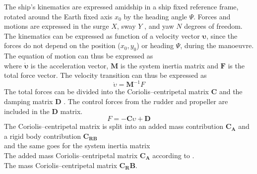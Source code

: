 The ship’s kinematics are expressed amidship in a ship fixed reference frame, rotated around the Earth fixed axis $x_0$ by the heading angle $\Psi$. Forces and motions are expressed in the surge $X$, sway $Y$ , and yaw $N$ degrees of freedom. The kinematics can be expressed as function of a velocity vector $\mathbf{\upsilon}$, since the forces do not depend on the position ($x_0,y_0$) or heading $\Psi$, during the manoeuvre.
\begin{equation}
    \label{eq:upsilon}
    
\end{equation}
The equation of motion can thus be expressed as
\begin{equation}
    \label{eq:upsilon1d}
    
\end{equation}
where $\mathbf{\dot{\upsilon}}$ is the acceleration vector, $\mathbf{M}$ is the system inertia matrix and $\mathbf{F}$ is the total force vector.
The velocity transition can thus be expressed as
\begin{equation}
    \label{eq:acc}
    \dot{\upsilon} = \mathbf{M}^{-1}F
\end{equation}
The total forces can be divided into the Coriolis–centripetal matrix $\mathbf{C}$ and the damping matrix $\mathbf{D}$ \citep{fossenHandbookMarineCraft2011}. The control forces from the rudder and propeller are included in the $\mathbf{D}$ matrix.
\begin{equation}
    \label{eq:upsilon1d}
F = - \mathbf{C} \upsilon + \mathbf{D}
\end{equation}
The Coriolis–centripetal matrix is split into an added mass contribution $\mathbf{C_A}$ and a rigid body contribution $\mathbf{C_{RB}}$
\begin{equation}
    \label{eq:C}
    
\end{equation}
and the same goes for the system inertia matrix
\begin{equation}
    \label{eq:M}
    
\end{equation}
The added mass Coriolis–centripetal matrix $\mathbf{C_A}$ according to \citep{imlayCOMPLETEEXPRESSIONSADDED1961}.
\begin{equation}
    \label{eq:C_A}
    
\end{equation}
The mass Coriolis–centripetal matrix $\mathbf{C_RB}$.
\begin{equation}
    \label{eq:C_RB}
    
\end{equation}
